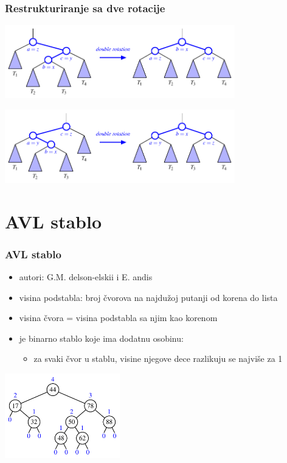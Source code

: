 \documentclass[compress]{beamer}
\begin{document}
\begin{frame}[fragile]
  \frametitle{Restrukturiranje sa dve rotacije}
  \begin{center}
    \includegraphics[width=10cm]{asp-11-pic12.pdf}
  \end{center}
  \begin{center}
    \includegraphics[width=10cm]{asp-11-pic13.pdf}
  \end{center}
\end{frame}

\section[AVL stablo]{AVL stablo}

\begin{frame}[fragile]
  \frametitle{AVL stablo}
  \begin{itemize}
    \item autori: G.M. delson-elskii i E. andis
    \item visina podstabla: broj čvorova na najdužoj putanji od korena do lista
    \item visina čvora = visina podstabla sa njim kao korenom
    \item {} je binarno stablo koje ima dodatnu osobinu:
    \begin{itemize}
      \item za svaki čvor u stablu, visine njegove dece razlikuju se najviše za 1
    \end{itemize}
  \end{itemize}
  \begin{center}
    \includegraphics[width=5cm]{asp-11-pic14.pdf}
  \end{center}
\end{frame}
\end{document}

